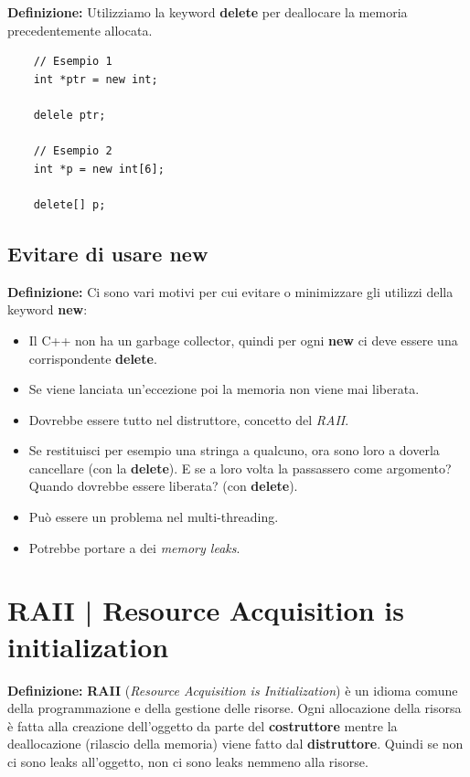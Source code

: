 \textsf{\small \textbf{Definizione: } Utilizziamo la keyword \textbf{delete} per deallocare la memoria precedentemente allocata.} \\

\begin{lstlisting}
	// Esempio 1
	int *ptr = new int;
	
	delele ptr;
	
	// Esempio 2
	int *p = new int[6];
	
	delete[] p;
\end{lstlisting}

\subsection{Evitare di usare new}

\textsf{\small \textbf{Definizione: } Ci sono vari motivi per cui evitare o minimizzare gli utilizzi della keyword \textbf{new}: } \\

\begin{itemize}
	\item \textsf{\small Il C++ non ha un garbage collector, quindi per ogni \textbf{new} ci deve essere una corrispondente \textbf{delete}.}
	\item \textsf{\small Se viene lanciata un'eccezione poi la memoria non viene mai liberata.}
	\item \textsf{\small Dovrebbe essere tutto nel distruttore, concetto del \emph{RAII}.} %
	\item \textsf{\small Se restituisci per esempio una stringa a qualcuno, ora sono loro a doverla cancellare (con la \textbf{delete}). E se a loro volta la passassero come argomento? Quando dovrebbe essere liberata? (con \textbf{delete}).}
	\item \textsf{\small Può essere un problema nel multi-threading.}
	\item \textsf{\small Potrebbe portare a dei \emph{memory leaks}.}
\end{itemize}


\section{RAII | Resource Acquisition is initialization}

\textsf{\small \textbf{Definizione: } \textbf{RAII} (\emph{Resource Acquisition is Initialization}) è un idioma comune della programmazione e della gestione delle risorse. Ogni allocazione della risorsa è fatta alla creazione dell'oggetto da parte del \textbf{costruttore} mentre la deallocazione (rilascio della memoria) viene fatto dal \textbf{distruttore}. Quindi se non ci sono leaks all'oggetto, non ci sono leaks nemmeno alla risorse. } \\

